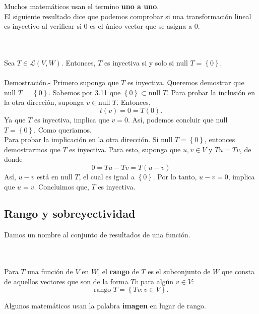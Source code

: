 Muchos matemáticos usan el termino \textbf{uno a uno}.\\

El siguiente resultado dice que podemos comprobar si una transformación lineal es inyectivo al verificar si $0$ es el único vector que se asigna a $0$.

\begin{myteo}\,\\\\
    Sea $T\in \mathcal{L}(V,W)$. Entonces, $T$ es inyectiva si y solo si null $T=\left\{0\right\}$.\\\\
	Demostración.-\; Primero suponga que $T$ es inyectiva. Queremos demostrar que null $T$ = $\left\{0\right\}$. Sabemos por 3.11 que $\left\{0\right\}\subset \mbox{null }T$. Para probar la inclusión en la otra dirección, suponga $v\in \mbox{null }T$. Entonces,
	$$t(v)=0=T(0).$$
	Ya que $T$ es inyectiva, implica que $v=0$. Así, podemos concluir que null $T=\left\{0\right\}$. Como queriamos.\\

	Para probar la implicación en la otra dirección. Si null $T=\left\{0\right\}$, entonces demostrarmos que $T$ es inyectiva. Para esto, suponga que $u,v\in V$ y $Tu=Tv$, de donde
	$$0=Tu-Tv=T(u-v)$$
	Así, $u-v$ está en null $T$, el cual es igual a $\left\{0\right\}$. Por lo tanto, $u-v=0$, implica que $u=v$. Concluimos que, $T$ es inyectiva.
\end{myteo}
\vspace{.5cm}

\subsection*{Rango y sobreyectividad}

Damos un nombre al conjunto de resultados de una función.

\begin{mydef}[Rango]\,\\\\
    Para $T$ una función de $V$ en $W$, el \textbf{rango} de $T$ es el subconjunto de $W$ que consta de aquellos vectores que son de la forma $Tv$ para algún $v\in V$:
$$\mbox{rango }T=\left\{Tv:v\in V\right\}.$$
\end{mydef}

Algunos matemáticos usan la palabra \textbf{imagen} en lugar de rango.\\

